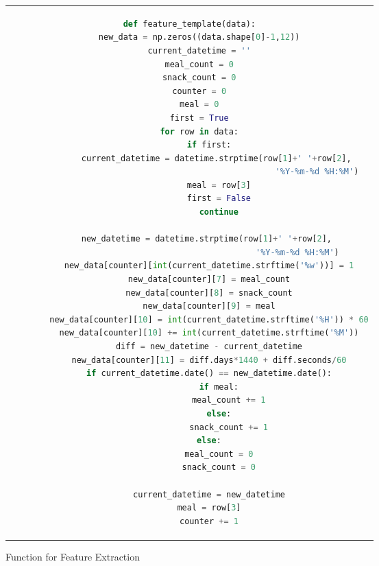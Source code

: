 \begin{figure}[htpb]
  \centering
  \begin{tabular}{c}
  \begin{lstlisting}[language=python, breaklines, breakatwhitespace]
def feature_template(data):
    new_data = np.zeros((data.shape[0]-1,12))
    current_datetime = ''
    meal_count = 0
    snack_count = 0
    counter = 0
    meal = 0
    first = True
    for row in data:
        if first:
            current_datetime = datetime.strptime(row[1]+' '+row[2], 
                                                    '%Y-%m-%d %H:%M')
            meal = row[3]
            first = False
            continue

        new_datetime = datetime.strptime(row[1]+' '+row[2], 
                                            '%Y-%m-%d %H:%M')
        new_data[counter][int(current_datetime.strftime('%w'))] = 1
        new_data[counter][7] = meal_count
        new_data[counter][8] = snack_count
        new_data[counter][9] = meal
        new_data[counter][10] = int(current_datetime.strftime('%H')) * 60
        new_data[counter][10] += int(current_datetime.strftime('%M'))
        diff = new_datetime - current_datetime
        new_data[counter][11] = diff.days*1440 + diff.seconds/60
        if current_datetime.date() == new_datetime.date():
            if meal:
                meal_count += 1
            else:
                snack_count += 1
        else:
            meal_count = 0
            snack_count = 0

        current_datetime = new_datetime
        meal = row[3]
        counter += 1
  \end{lstlisting}
  \end{tabular}
  \caption[Function for Feature Extraction]{Function for Feature Extraction}
  \label{fig:feature_template}
\end{figure}

